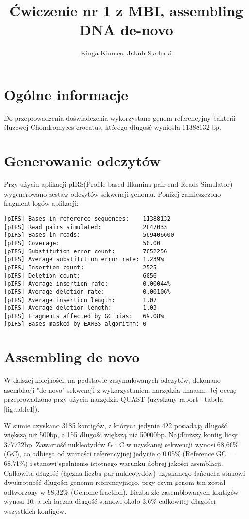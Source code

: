 \documentclass[a4paper]{article}
\begin{document}
\title{Ćwiczenie nr 1 z MBI, assembling DNA de-novo}
\author{Kinga Kimnes, Jakub Skałecki}
\maketitle

\section{Ogólne informacje}

Do przeprowadzenia doświadczenia wykorzystano genom referencyjny bakterii śluzowej Chondromyces crocatus, którego długość wyniosła 11388132 bp.


\section{Generowanie odczytów}

Przy użyciu aplikacji pIRS(Profile-based Illumina pair-end Reads Simulator) wygenerowano zestaw odczytów sekwencji genomu. Poniżej zamieszczono fragment logów aplikacji:

\begin{verbatim}
[pIRS] Bases in reference sequences:    11388132
[pIRS] Read pairs simulated:            2847033
[pIRS] Bases in reads:                  569406600
[pIRS] Coverage:                        50.00
[pIRS] Substitution error count:        7052256
[pIRS] Average substitution error rate: 1.239%
[pIRS] Insertion count:                 2525
[pIRS] Deletion count:                  6056
[pIRS] Average insertion rate:          0.00044%
[pIRS] Average deletion rate:           0.00106%
[pIRS] Average insertion length:        1.07
[pIRS] Average deletion length:         1.03
[pIRS] Fragments affected by GC bias:   69.08%
[pIRS] Bases masked by EAMSS algorithm: 0
\end{verbatim}

\section{Assembling de novo}

W dalszej kolejności, na podstawie zasymulowanych odczytów, dokonano asemblacji "de novo" sekwencji  z wykorzystaniem narzędzia dnaasm. Jej ocenę przeprowadzono przy użyciu narzędzia QUAST (uzyskany raport - tabela \ref{fig:table1}).

W sumie uzyskano 3185 kontigów, z których jedynie 422 posiadają długość większą niż 500bp, a 155 długość większą niż 50000bp. Najdłuższy kontig liczy 377722bp. Zawartość nukleotydów G i C w uzyskanej sekwencji wynosi 68,66\% (GC), co odbiega od wartości referencyjnej jedynie o 0,05\% (Reference GC = 68,71\%) i stanowi spełnienie istotnego warunku dobrej jakości asemblacji. Całkowita długość (łączna liczba par nukleotydów) uzyskanego łańcucha stanowi dwukrotność długości genomu referencyjnego, przy czym genom ten został odtworzony w 98,32\% (Genome fraction). Liczba źle zasemblowanych kontigów wynosi 10, a ich łączna długość stanowi około 3,6\% całkowitej długości wszystkich kontigów.
\end{document}
